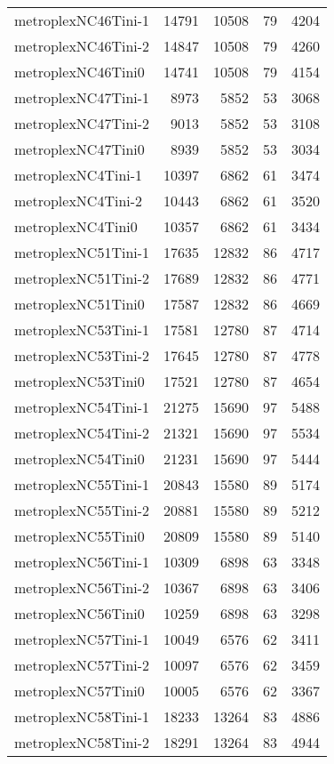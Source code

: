 \begin{longtable}{lrrrr}
metroplexNC46Tini-1 & 14791 & 10508 & 79 & 4204 \\
metroplexNC46Tini-2 & 14847 & 10508 & 79 & 4260 \\
metroplexNC46Tini0 & 14741 & 10508 & 79 & 4154 \\
metroplexNC47Tini-1 & 8973 & 5852 & 53 & 3068 \\
metroplexNC47Tini-2 & 9013 & 5852 & 53 & 3108 \\
metroplexNC47Tini0 & 8939 & 5852 & 53 & 3034 \\
metroplexNC4Tini-1 & 10397 & 6862 & 61 & 3474 \\
metroplexNC4Tini-2 & 10443 & 6862 & 61 & 3520 \\
metroplexNC4Tini0 & 10357 & 6862 & 61 & 3434 \\
metroplexNC51Tini-1 & 17635 & 12832 & 86 & 4717 \\
metroplexNC51Tini-2 & 17689 & 12832 & 86 & 4771 \\
metroplexNC51Tini0 & 17587 & 12832 & 86 & 4669 \\
metroplexNC53Tini-1 & 17581 & 12780 & 87 & 4714 \\
metroplexNC53Tini-2 & 17645 & 12780 & 87 & 4778 \\
metroplexNC53Tini0 & 17521 & 12780 & 87 & 4654 \\
metroplexNC54Tini-1 & 21275 & 15690 & 97 & 5488 \\
metroplexNC54Tini-2 & 21321 & 15690 & 97 & 5534 \\
metroplexNC54Tini0 & 21231 & 15690 & 97 & 5444 \\
metroplexNC55Tini-1 & 20843 & 15580 & 89 & 5174 \\
metroplexNC55Tini-2 & 20881 & 15580 & 89 & 5212 \\
metroplexNC55Tini0 & 20809 & 15580 & 89 & 5140 \\
metroplexNC56Tini-1 & 10309 & 6898 & 63 & 3348 \\
metroplexNC56Tini-2 & 10367 & 6898 & 63 & 3406 \\
metroplexNC56Tini0 & 10259 & 6898 & 63 & 3298 \\
metroplexNC57Tini-1 & 10049 & 6576 & 62 & 3411 \\
metroplexNC57Tini-2 & 10097 & 6576 & 62 & 3459 \\
metroplexNC57Tini0 & 10005 & 6576 & 62 & 3367 \\
metroplexNC58Tini-1 & 18233 & 13264 & 83 & 4886 \\
metroplexNC58Tini-2 & 18291 & 13264 & 83 & 4944 \\

\end{longtable}
